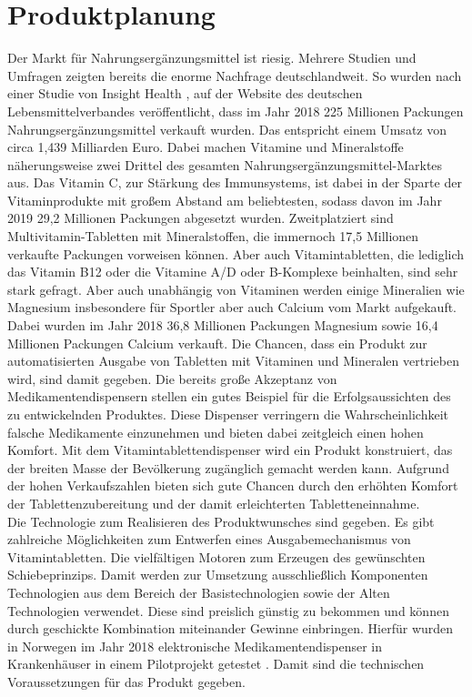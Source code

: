 \section{Produktplanung}
Der Markt für Nahrungsergänzungsmittel ist riesig. Mehrere Studien und Umfragen zeigten bereits die enorme Nachfrage deutschlandweit. So wurden nach einer Studie von Insight Health \cite{studie1}, auf der Website des deutschen Lebensmittelverbandes veröffentlicht, dass im Jahr 2018 225 Millionen Packungen Nahrungsergänzungsmittel verkauft wurden. Das entspricht einem Umsatz von circa 1,439 Milliarden Euro. Dabei machen Vitamine und Mineralstoffe näherungsweise zwei Drittel des gesamten Nahrungsergänzungsmittel-Marktes aus. Das Vitamin C, zur Stärkung des Immunsystems, ist dabei in der Sparte der Vitaminprodukte mit großem Abstand am beliebtesten, sodass davon im Jahr 2019 29,2 Millionen Packungen abgesetzt wurden. Zweitplatziert sind Multivitamin-Tabletten mit Mineralstoffen, die immernoch 17,5 Millionen verkaufte Packungen vorweisen können. Aber auch Vitamintabletten, die lediglich das Vitamin B12 oder die Vitamine A/D oder B-Komplexe beinhalten, sind sehr stark gefragt. Aber auch unabhängig von Vitaminen werden einige Mineralien wie Magnesium insbesondere für Sportler aber auch Calcium vom Markt aufgekauft. Dabei wurden im Jahr 2018 36,8 Millionen Packungen Magnesium sowie 16,4 Millionen Packungen Calcium verkauft. Die Chancen, dass ein Produkt zur automatisierten Ausgabe von Tabletten mit Vitaminen und Mineralen vertrieben wird, sind damit gegeben. Die bereits große Akzeptanz von Medikamentendispensern stellen ein gutes Beispiel für die Erfolgsaussichten des zu entwickelnden Produktes. Diese Dispenser verringern die Wahrscheinlichkeit falsche Medikamente einzunehmen und bieten dabei zeitgleich einen hohen Komfort. Mit dem Vitamintablettendispenser wird ein Produkt konstruiert, das der breiten Masse der Bevölkerung zugänglich gemacht werden kann. Aufgrund der hohen Verkaufszahlen bieten sich gute Chancen durch den erhöhten Komfort der Tablettenzubereitung und der damit erleichterten Tabletteneinnahme.\\
Die Technologie zum Realisieren des Produktwunsches sind gegeben. Es gibt zahlreiche Möglichkeiten zum Entwerfen eines Ausgabemechanismus von Vitamintabletten. Die vielfältigen Motoren zum Erzeugen des gewünschten Schiebeprinzips. Damit werden zur Umsetzung ausschließlich Komponenten Technologien aus dem Bereich der Basistechnologien sowie der Alten Technologien verwendet. Diese sind preislich günstig zu bekommen und können durch geschickte Kombination miteinander Gewinne einbringen. Hierfür wurden in Norwegen im Jahr 2018 elektronische Medikamentendispenser in Krankenhäuser in einem Pilotprojekt getestet \cite{studie2}. Damit sind die technischen Voraussetzungen für das Produkt gegeben.\\
